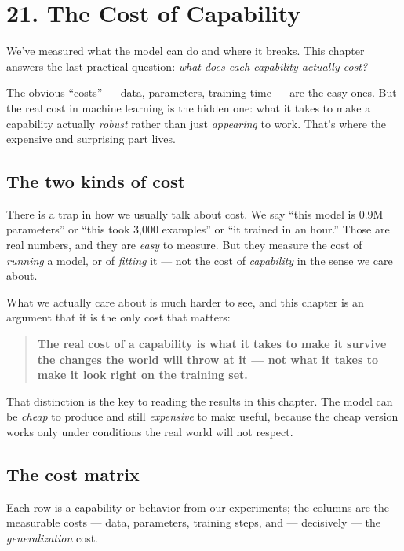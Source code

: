 \chapter{21. The Cost of Capability}\label{the-cost-of-capability}

We've measured what the model can do and where it breaks. This chapter
answers the last practical question: \emph{what does each capability
actually cost?}

The obvious ``costs'' --- data, parameters, training time --- are the
easy ones. But the real cost in machine learning is the hidden one: what
it takes to make a capability actually \emph{robust} rather than just
\emph{appearing} to work. That's where the expensive and surprising part
lives.

\section{The two kinds of cost}\label{the-two-kinds-of-cost}

There is a trap in how we usually talk about cost. We say ``this model
is 0.9M parameters'' or ``this took 3,000 examples'' or ``it trained in
an hour.'' Those are real numbers, and they are \emph{easy} to measure.
But they measure the cost of \emph{running} a model, or of
\emph{fitting} it --- not the cost of \emph{capability} in the sense we
care about.

What we actually care about is much harder to see, and this chapter is
an argument that it is the only cost that matters:

\begin{quote}
\textbf{The real cost of a capability is what it takes to make it
survive the changes the world will throw at it --- not what it takes to
make it look right on the training set.}
\end{quote}

That distinction is the key to reading the results in this chapter. The
model can be \emph{cheap} to produce and still \emph{expensive} to make
useful, because the cheap version works only under conditions the real
world will not respect.

\section{The cost matrix}\label{the-cost-matrix}

Each row is a capability or behavior from our experiments; the columns
are the measurable costs --- data, parameters, training steps, and ---
decisively --- the \emph{generalization} cost.

